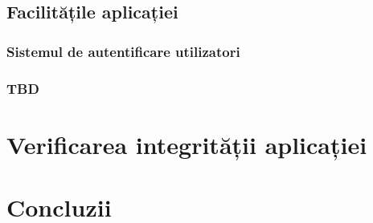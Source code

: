 \documentclass[12pt,a4paper]{report}
\theoremstyle{definition}
\theoremstyle{remark}
\begin{document}
\newpage

\section{Facilitățile aplicației}

\subsection{Sistemul de autentificare utilizatori}

\subsection{TBD}

\chapter{Verificarea integrității aplicației}

\chapter{Concluzii}



\end{document}
